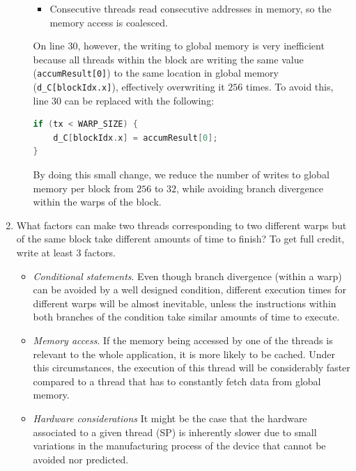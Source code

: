 \documentclass{article}
\begin{document}
\begin{enumerate}[1.]
\begin{enumerate}[(a)]
\begin{itemize}
            \item Consecutive threads read consecutive addresses in memory, so the memory access is coalesced.
        \end{itemize}
        On line 30, however, the writing to global memory is very inefficient because all threads within the block are writing the same value (\texttt{accumResult[0]}) to the same location in global memory (\texttt{d\_C[blockIdx.x]}), effectively overwriting it $256$ times. To avoid this, line 30 can be replaced with the following:
\begin{lstlisting}[language=C]
if (tx < WARP_SIZE) {
    d_C[blockIdx.x] = accumResult[0];
}\end{lstlisting}
        By doing this small change, we reduce the number of writes to global memory per block from $256$ to $32$, while avoiding branch divergence within the warps of the block.
	\end{enumerate}
	
	\item What factors can make two threads corresponding to two different warps but of the same block take different amounts of time to finish? To get full credit, write at least 3 factors.
	\begin{itemize}
	    \item \emph{Conditional statements}. Even though branch divergence (within a warp) can be avoided by a well designed condition, different execution times for different warps will be almost inevitable, unless the instructions within both branches of the condition take similar amounts of time to execute.
	    \item \emph{Memory access}. If the memory being accessed by one of the threads is relevant to the whole application, it is more likely to be cached. Under this circumstances, the execution of this thread will be considerably faster compared to a thread that has to constantly fetch data from global memory.
	    \item \emph{Hardware considerations} It might be the case that the hardware associated to a given thread (SP) is inherently slower due to small variations in the manufacturing process of the device that cannot be avoided nor predicted.
	\end{itemize}
	

\end{enumerate}
\end{document}
